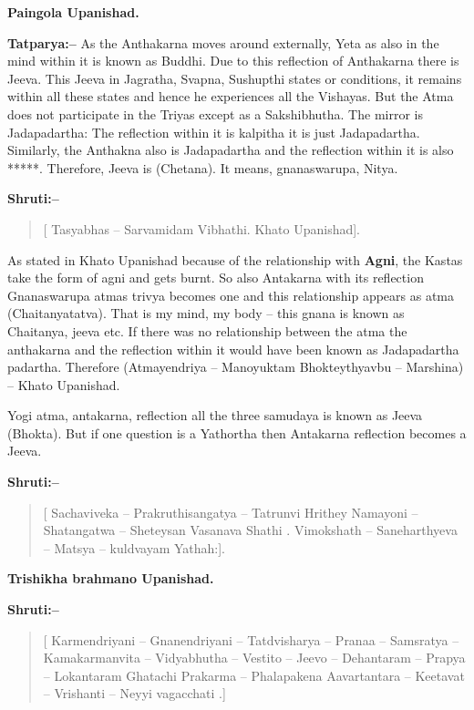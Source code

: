 \begin{flushright}
\textbf{Paingola Upanishad.}
\end{flushright}

\textbf{Tatparya:–} As the Anthakarna moves around externally, Yeta as also in the mind within it is known as Buddhi. Due to this reflection of Anthakarna there is Jeeva. This Jeeva in Jagratha, Svapna, Sushupthi states or conditions, it remains within all these states and hence he experiences all the Vishayas. But the Atma does not participate in the Triyas except as a Sakshibhutha. The mirror is Jadapadartha: The reflection within it is kalpitha it is just Jadapadartha. Similarly, the Anthakna also is Jadapadartha and the reflection within it is also *****. Therefore, Jeeva is (Chetana). It means, gnanaswarupa, Nitya.

\textbf{Shruti:–}

\begin{verse}
[ Tasyabhas – Sarvamidam Vibhathi. Khato Upanishad].
\end{verse}

As stated in Khato Upanishad because of the relationship with \textbf{Agni}, the Kastas take the form of agni and gets burnt. So also Antakarna with its reflection Gnanaswarupa atmas trivya becomes one and this relationship appears as atma (Chaitanyatatva). That is my mind, my body – this gnana is known as Chaitanya, jeeva etc. If there was no relationship between the atma the anthakarna and the reflection within it would have been known as Jadapadartha padartha. Therefore (Atmayendriya – Manoyuktam Bhokteythyavbu – Marshina) – Khato Upanishad.

Yogi atma, antakarna, reflection all the three samudaya is known as Jeeva (Bhokta). But if one question is a Yathortha then Antakarna reflection becomes a Jeeva.

\textbf{Shruti:–}

\begin{verse}
[ Sachaviveka – Prakruthisangatya – Tatrunvi Hrithey  Namayoni – Shatangatwa – Sheteysan Vasanava Shathi . Vimokshath – Saneharthyeva – Matsya – kuldvayam Yathah:].
\end{verse}

\begin{flushright}
\textbf{Trishikha brahmano Upanishad.}
\end{flushright}

\textbf{Shruti:–}

\begin{verse}
[ Karmendriyani – Gnanendriyani – Tatdvisharya – Pranaa – Samsratya – Kamakarmanvita – Vidyabhutha – Vestito – Jeevo – Dehantaram – Prapya – Lokantaram Ghatachi  Prakarma – Phalapakena Aavartantara – Keetavat – Vrishanti – Neyyi vagacchati .]
\end{verse}

